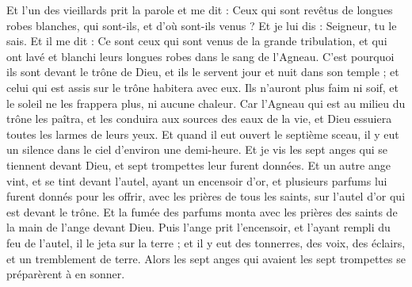 \begin{multicols}{2}
Et l'un des vieillards prit la parole et me dit : Ceux qui sont revêtus de longues robes blanches, qui sont-ils, et d'où sont-ils venus ?
Et je lui dis : Seigneur, tu le sais. Et il me dit : Ce sont ceux qui sont venus de la grande tribulation, et qui ont lavé et blanchi leurs longues robes dans le sang de l'Agneau.
C'est pourquoi ils sont devant le trône de Dieu, et ils le servent jour et nuit dans son temple ; et celui qui est assis sur le trône habitera avec eux.
Ils n'auront plus faim ni soif, et le soleil ne les frappera plus, ni aucune chaleur.
Car l'Agneau qui est au milieu du trône les paîtra, et les conduira aux sources des eaux de la vie, et Dieu essuiera toutes les larmes de leurs yeux.
\VerseOne{}Et quand il eut ouvert le septième sceau, il y eut un silence dans le ciel d'environ une demi-heure.
Et je vis les sept anges qui se tiennent devant Dieu, et sept trompettes leur furent données.
Et un autre ange vint, et se tint devant l'autel, ayant un encensoir d'or, et plusieurs parfums lui furent donnés pour les offrir, avec les prières de tous les saints, sur l'autel d'or qui est devant le trône.
Et la fumée des parfums monta avec les prières des saints de la main de l'ange devant Dieu.
Puis l'ange prit l'encensoir, et l'ayant rempli du feu de l'autel, il le jeta sur la terre ; et il y eut des tonnerres, des voix, des éclairs, et un tremblement de terre.
Alors les sept anges qui avaient les sept trompettes se préparèrent à en sonner.

\end{multicols}
